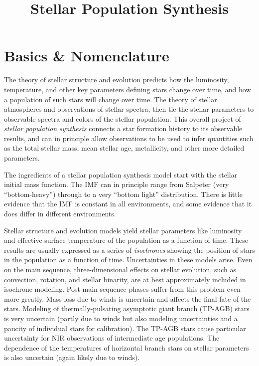 \title{\bf Stellar Population Synthesis}

\section{Basics \& Nomenclature}

The theory of stellar structure and evolution predicts how the
luminosity, temperature, and other key parameters defining stars
change over time, and how a population of such stars will change over
time. The theory of stellar atmospheres and observations of stellar
spectra, then tie the stellar parameters to observable spectra and
colors of the stellar population. This overall project of {\it stellar
  population synthesis} connects a star formation history to its
observable results, and can in principle allow observations to be used
to infer quantities such as the total stellar mass, mean stellar age,
metallicity, and other more detailed parameters.

The ingredients of a stellar population synthesis model start with the
stellar initial mass function. The IMF can in principle range from
Salpeter (very ``bottom-heavy'') through to a very ``bottom light''
distribution. There is little evidence that the IMF is constant in all
environments, and some evidence that it does differ in different
environments.

Stellar structure and evolution models yield stellar parameters like
luminosity and effective surface temperature of the population as a
function of time. These results are usually expressed as a series of
{\it isochrones} showing the position of stars in the population as a
function of time. Uncertainties in these models arise. Even on the
main sequence, three-dimensional effects on stellar evolution, such as
convection, rotation, and stellar binarity, are at best approximately
included in isochrone modeling.  Post main sequence phases suffer from
this problem even more greatly. Mass-loss due to winds is uncertain
and affects the final fate of the stars.  Modeling of
thermally-pulsating asymptotic giant branch (TP-AGB) stars is very
uncertain (partly due to winds but also modeling uncertainties and a
paucity of individual stars for calibration). The TP-AGB stars cause
particular uncertainty for NIR observations of intermediate age
populations. The dependence of the temperatures of horizontal branch
stars on stellar parameters is also uncertain (again likely due to
winds).

